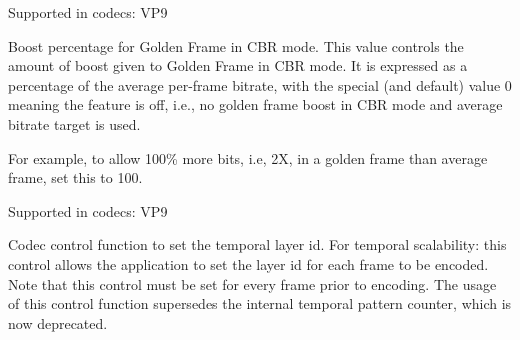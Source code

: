 \begin{Desc}
\begin{description}
Supported in codecs\+: V\+P9 \item[{\em 
V\+P9\+E\+\_\+\+S\+E\+T\+\_\+\+G\+F\+\_\+\+C\+B\+R\+\_\+\+B\+O\+O\+S\+T\+\_\+\+P\+CT\hypertarget{group__vp8__encoder_gga6deae3d561c838952552c3d3756322ecae38181c436d82d8554b43303e18cff0b}{}\label{group__vp8__encoder_gga6deae3d561c838952552c3d3756322ecae38181c436d82d8554b43303e18cff0b}
}]Boost percentage for Golden Frame in C\+BR mode. This value controls the amount of boost given to Golden Frame in C\+BR mode. It is expressed as a percentage of the average per-\/frame bitrate, with the special (and default) value 0 meaning the feature is off, i.\+e., no golden frame boost in C\+BR mode and average bitrate target is used.

For example, to allow 100\% more bits, i.\+e, 2X, in a golden frame than average frame, set this to 100.

Supported in codecs\+: V\+P9 \item[{\em 
V\+P8\+E\+\_\+\+S\+E\+T\+\_\+\+T\+E\+M\+P\+O\+R\+A\+L\+\_\+\+L\+A\+Y\+E\+R\+\_\+\+ID\hypertarget{group__vp8__encoder_gga6deae3d561c838952552c3d3756322eca97533c494b55a54f6136cc2788966a03}{}\label{group__vp8__encoder_gga6deae3d561c838952552c3d3756322eca97533c494b55a54f6136cc2788966a03}
}]Codec control function to set the temporal layer id. For temporal scalability\+: this control allows the application to set the layer id for each frame to be encoded. Note that this control must be set for every frame prior to encoding. The usage of this control function supersedes the internal temporal pattern counter, which is now deprecated.


\end{description}
\end{Desc}
